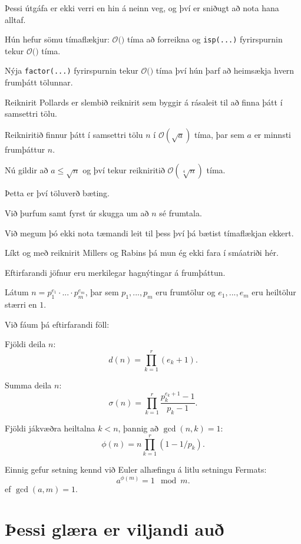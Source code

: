 {
}

{
    {
        \item<1-> Þessi útgáfa er ekki verri en hin á neinn veg, og því er sniðugt að nota hana alltaf.
        \item<2-> Hún hefur sömu tímaflækjur: $\mathcal{O}($$)$ tíma að forreikna 
            og \texttt{isp(...)} fyrirspurnin tekur $\mathcal{O}($$)$ tíma.
        \item<5-> Nýja \texttt{factor(...)} fyrirspurnin tekur $\mathcal{O}($$)$
            tíma því hún þarf að heimsækja hvern frumþátt tölunnar.
    }
}

{
    {
        \item<1-> Reiknirit Pollards er slembið reiknirit sem byggir á rásaleit til að finna þátt í samsettri tölu.
        \item<2-> Reikniritið finnur þátt í samsettri tölu $n$ í $\mathcal{O}(\sqrt{a})$ tíma, þar sem $a$ er minnsti frumþáttur $n$.
        \item<3-> Nú gildir að $a \leq \sqrt{n}$ og því tekur reikniritið $\mathcal{O}(\sqrt[4]{n})$ tíma.
        \item<4-> Þetta er því töluverð bæting.
        \item<5-> Við þurfum samt fyrst úr skugga um að $n$ sé frumtala.
        \item<6-> Við megum þó ekki nota tæmandi leit til þess því þá bætist tímaflækjan ekkert.
        \item<7-> Líkt og með reiknirit Millers og Rabins þá mun ég ekki fara í smáatriði hér.
    }
}

{
}

{
}

{
    {
        \item<1-> Eftirfarandi jöfnur eru merkilegar hagnýtingar á frumþáttun.
        \item<2-> Látum $n = p_1^{e_1} \cdot ... \cdot p_m^{e_m}$, þar sem $p_1, ..., p_m$ eru frumtölur og $e_1, ..., e_m$ eru heiltölur stærri en $1$.
        \item<3-> Við fáum þá eftirfarandi föll:
        {
            \item<4-> Fjöldi deila $n$:
            \[
                d(n) = \prod_{k = 1}^r (e_k + 1).
            \]
            \item<5-> Summa deila $n$:
            \[
                \sigma(n) = \prod_{k = 1}^r \frac{p_k^{e_k + 1} - 1}{p_k - 1}.
            \]
            \item<6-> Fjöldi jákvæðra heiltalna $k < n$, þannig að $\gcd(n, k) = 1$:
            \[
                \phi(n) = n\prod_{k = 1}^r (1 - 1/p_k).
            \]
        }
        \item<7-> Einnig gefur setning kennd við Euler alhæfingu á litlu setningu Fermats:
        \[
            a^{\phi(m)} = 1 \mod m.
        \]
            ef $\gcd(a, m) = 1$.
    }
}

\section{Þessi glæra er viljandi auð}
{
}


